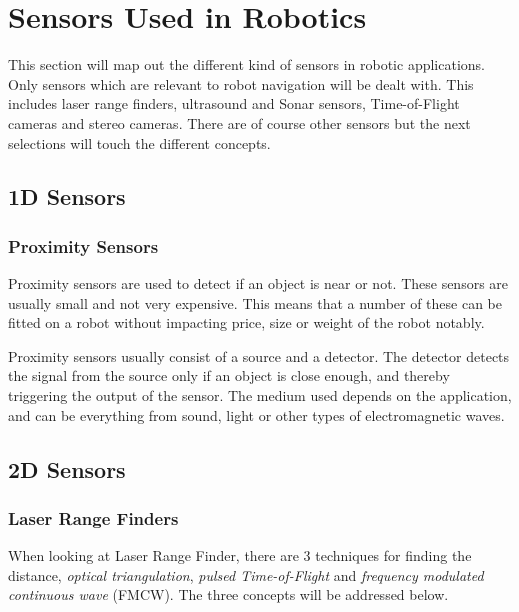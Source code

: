 \section{Sensors Used in Robotics}
This section will map out the different kind of sensors in robotic applications. Only
sensors which are relevant to robot navigation will be dealt with. This includes
laser range finders, ultrasound and Sonar sensors, Time-of-Flight cameras and
stereo cameras. There are of course other sensors but the next selections will touch the
different concepts. 


\subsection{1D Sensors}

\subsubsection{Proximity Sensors}
Proximity sensors are used to detect if an object is near or not. These sensors are usually
small and not very expensive. This means that a number of these can be fitted on a robot
without impacting price, size or weight of the robot notably.  

Proximity sensors usually consist of a source and a detector. The detector detects the
signal from the source only if an object is close enough, and thereby triggering the
output of the sensor. The medium used depends on the application, and can be everything
from sound, light or other types of electromagnetic waves. \cite{proximity}

\subsection{2D Sensors}

\subsubsection{Laser Range Finders}
When looking at Laser Range Finder, there are 3 techniques for finding the distance,
\emph{optical triangulation}, \emph{pulsed Time-of-Flight} and \emph{frequency modulated
continuous wave} (FMCW). The three concepts will be addressed below. \cite{laser-ranging-critical-review}

